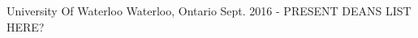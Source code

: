 \begin{siderulesEdu}
\begin{cventries}
  \cventry
    {\bodyfont\scshape\color{black}{Candidate of B.ASc: Honours Mechanical Engineering 2021, Artificial Intelligence Option}}
    {University Of Waterloo}
    {Waterloo, Ontario}
    {Sept. 2016 - PRESENT}
    {DEANS LIST HERE? }
\end{cventries}
\end{siderulesEdu}
